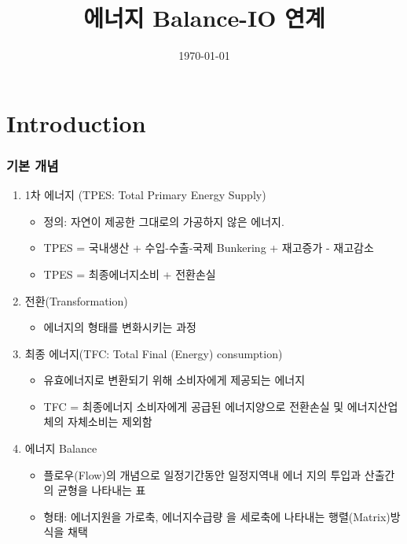 \documentclass[10pt,compress,slidetop,%
			   hyperref={unicode},xcolor={svgnames},%
			   t]{beamer}
\title %
{에너지 Balance-IO 연계}
\date[08-11-09] 														%
{\today}																			%
\begin{document}
% 
\begin{frame}
  \titlepage
\end{frame}
%
\section{Introduction}

\begin{frame}
	\frametitle{기본 개념}
	\begin{enumerate}
	\item{1차 에너지 (TPES: Total Primary Energy Supply)}
		\begin{itemize}
		\item{정의: 자연이 제공한 그대로의 가공하지 않은 에너지.}
		\item{TPES = 국내생산 + 수입-수출-국제 Bunkering + 재고증가 - 재고감소}
		\item{TPES = 최종에너지소비 + 전환손실}
		\end{itemize}
	\item{전환(Transformation)}
		\begin{itemize}
		\item{에너지의 형태를 변화시키는 과정}
		\end{itemize}
	\item{최종 에너지(TFC: Total Final (Energy) consumption)}
      	\begin{itemize}
		\item{유효에너지로 변환되기 위해 소비자에게 제공되는 에너지}
		\item{TFC = 최종에너지 소비자에게 공급된 에너지양으로 전환손실 및 에너지산업체의 자체소비는 제외함 }
		\end{itemize}
	\item{에너지 Balance}
		\begin{itemize}
		\item{플로우(Flow)의 개념으로 일정기간동안 일정지역내 에너
지의 투입과 산출간의 균형을 나타내는 표}
		\item{형태: 에너지원을 가로축, 에너지수급량
을 세로축에 나타내는 행렬(Matrix)방식을 채택}
		\end{itemize}
	\end{enumerate}
	
\end{frame}
\end{document}
